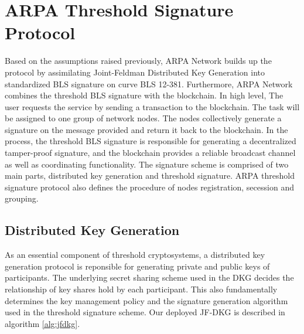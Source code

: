 \documentclass[11pt]{article}
\begin{document}
\section{ARPA Threshold Signature Protocol}

Based on the assumptions raised previously, ARPA Network builds up the protocol by assimilating Joint-Feldman Distributed Key Generation\cite{pedersen1991non} into standardized BLS signature\cite{irtf-cfrg-bls-signature-05} on curve BLS 12-381\cite{sean2017bls}. Furthermore, ARPA Network combines the threshold BLS signature with the blockchain. In high level, The user requests the service by sending a transaction to the blockchain. The task will be assigned to one group of network nodes. The nodes collectively generate a signature on the message provided and return it back to the blockchain. In the process, the threshold BLS signature is responsible for generating a decentralized tamper-proof signature, and the blockchain provides a reliable broadcast channel as well as coordinating functionality. The signature scheme is comprised of two main parts, distributed key generation and threshold signature. ARPA threshold signature protocol also defines the procedure of nodes registration, secession and grouping.

\subsection{Distributed Key Generation}

As an essential component of threshold cryptosystems, a distributed key generation protocol is reponsible for generating private and public keys of participants. The underlying secret sharing scheme used in the DKG decides the relationship of key shares hold by each participant. This also fundamentally determines the key management policy and the signature generation algorithm used in the threshold signature scheme. Our deployed JF-DKG is described in algorithm \ref{alg:jfdkg}.
\end{document}
